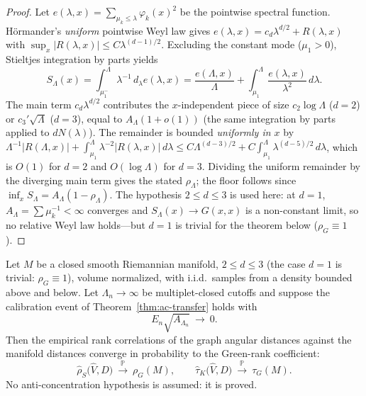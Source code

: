 \begin{proof}
Let $e(\lambda,x)=\sum_{\mu_k\le\lambda}\varphi_k(x)^2$ be the pointwise spectral
function. H\"ormander's \emph{uniform} pointwise Weyl law
\cite{hormander} gives $e(\lambda,x)=c_d\lambda^{d/2}
+R(\lambda,x)$ with $\sup_x\lvert R(\lambda,x)\rvert\le C\lambda^{(d-1)/2}$.
Excluding the constant mode ($\mu_1>0$), Stieltjes integration by parts yields
\[
S_\Lambda(x)=\int_{\mu_1^-}^{\Lambda}\lambda^{-1}\,d_\lambda e(\lambda,x)
=\frac{e(\Lambda,x)}{\Lambda}+\int_{\mu_1}^{\Lambda}\frac{e(\lambda,x)}{\lambda^2}\,d\lambda .
\]
The main term $c_d\lambda^{d/2}$ contributes the $x$-independent piece of size
$c_2\log\Lambda$ ($d=2$) or $c_3'\sqrt\Lambda$ ($d=3$), equal to $A_\Lambda(1+o(1))$
(the same integration by parts applied to $dN(\lambda)$). The remainder is bounded
\emph{uniformly in $x$} by
$\Lambda^{-1}\lvert R(\Lambda,x)\rvert+\int_{\mu_1}^{\Lambda}\lambda^{-2}\lvert
R(\lambda,x)\rvert\,d\lambda\le C\Lambda^{(d-3)/2}+C\int_{\mu_1}^{\Lambda}
\lambda^{(d-5)/2}\,d\lambda$, which is $O(1)$ for $d=2$ and $O(\log\Lambda)$ for
$d=3$. Dividing the uniform remainder by the diverging main term gives the stated
$\rho_\Lambda$; the floor follows since $\inf_x S_\Lambda=A_\Lambda(1-\rho_\Lambda)$.
The hypothesis $2\le d\le3$ is used here: at $d=1$, $A_\Lambda=\sum\mu_k^{-1}<\infty$
converges and $S_\Lambda(x)\to G(x,x)$ is a non-constant limit, so no relative Weyl
law holds---but $d{=}1$ is trivial for the theorem below ($\rho_G\equiv1$).
\end{proof}

\begin{theorem}\label{thm:growing}
Let $M$ be a closed smooth Riemannian manifold, $2\le d\le3$ (the case $d{=}1$ is
trivial: $\rho_G\equiv1$), volume normalized, with
i.i.d.\ samples from a density bounded above and below.  Let $\Lambda_n\to\infty$
be multiplet-closed cutoffs and suppose the calibration event of
Theorem~\ref{thm:ac-transfer} holds with
\[
E_n\sqrt{A_{\Lambda_n}}\ \longrightarrow\ 0 .
\]
Then the empirical rank correlations of the graph angular distances against the
manifold distances converge in probability to the Green-rank coefficient:
\[
\widehat\rho_S\bigl(\widehat V,D\bigr)\ \xrightarrow{\ \mathbb P\ }\ \rho_G(M),
\qquad
\widehat\tau_K\bigl(\widehat V,D\bigr)\ \xrightarrow{\ \mathbb P\ }\ \tau_G(M).
\]
No anti-concentration hypothesis is assumed: it is proved.
\end{theorem}

